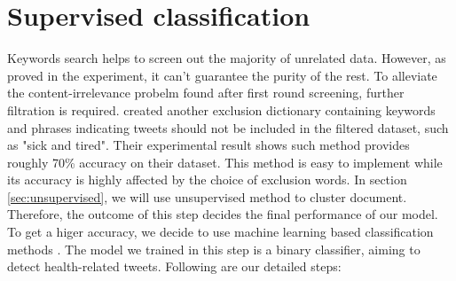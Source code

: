 \section{Supervised classification}
\label{sec:Supervised classification}
Keywords search helps to screen out the majority of unrelated data. However, as proved in the experiment, it can't guarantee the purity of the rest. To alleviate the content-irrelevance probelm found after first round screening, further filtration is required. \cite{elkin2017network} created another exclusion dictionary containing keywords and phrases indicating tweets should not be included in the filtered dataset, such as "sick and tired". Their experimental result shows such method provides roughly 70\% accuracy on their dataset. This method is easy to implement while its accuracy is highly affected by the choice of exclusion words. In section \ref{sec:unsupervised}, we will use unsupervised method to cluster document. Therefore, the outcome of this step decides the final performance of our model. To get a higer accuracy, we decide to use machine learning based classification methods \cite{aramaki2011twitter}. The model we trained in this step is a binary classifier, aiming to detect health-related tweets. Following are our detailed steps:
